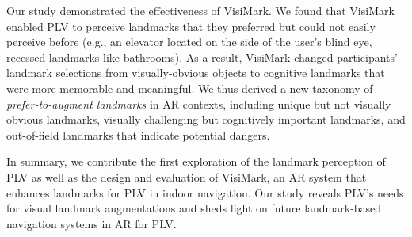Our study demonstrated the effectiveness of VisiMark. We found that VisiMark enabled PLV to perceive landmarks that they preferred but could not easily perceive before (e.g., an elevator located on the side of the user's blind eye, recessed landmarks like bathrooms). As a result, VisiMark changed participants' landmark selections from visually-obvious objects to cognitive landmarks that were more memorable and meaningful. We thus derived a new taxonomy of \textit{prefer-to-augment landmarks} in AR contexts, including unique but not visually obvious landmarks, visually challenging but cognitively important landmarks, and out-of-field landmarks that indicate potential dangers.%


In summary, we contribute the first exploration of the landmark perception of PLV as well as the design and evaluation of VisiMark, an AR system that enhances landmarks for PLV in indoor navigation. Our study reveals PLV’s needs for visual landmark augmentations and sheds light on future landmark-based navigation systems in AR for PLV.